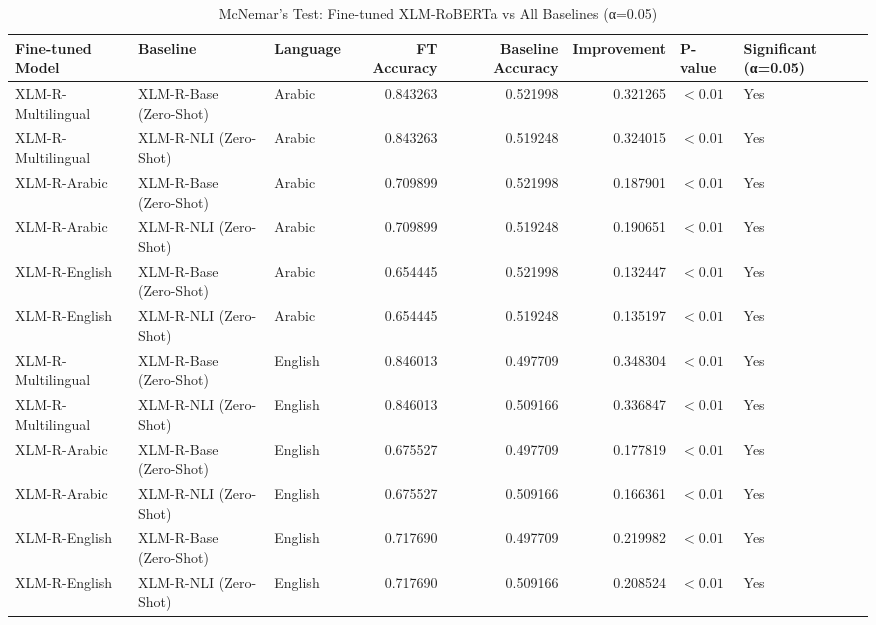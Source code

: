 \begin{table}
\caption{McNemar's Test: Fine-tuned XLM-RoBERTa vs All Baselines (α=0.05)}
\label{tab:mcnemar_all_baselines}
\begin{tabular}{lllrrrll}
\toprule
Fine-tuned Model & Baseline & Language & FT Accuracy & Baseline Accuracy & Improvement & P-value & Significant (α=0.05) \\
\midrule
XLM-R-Multilingual & XLM-R-Base (Zero-Shot) & Arabic & 0.843263 & 0.521998 & 0.321265 & $<0.01$ & Yes \\
XLM-R-Multilingual & XLM-R-NLI (Zero-Shot) & Arabic & 0.843263 & 0.519248 & 0.324015 & $<0.01$ & Yes \\
XLM-R-Arabic & XLM-R-Base (Zero-Shot) & Arabic & 0.709899 & 0.521998 & 0.187901 & $<0.01$ & Yes \\
XLM-R-Arabic & XLM-R-NLI (Zero-Shot) & Arabic & 0.709899 & 0.519248 & 0.190651 & $<0.01$ & Yes \\
XLM-R-English & XLM-R-Base (Zero-Shot) & Arabic & 0.654445 & 0.521998 & 0.132447 & $<0.01$ & Yes \\
XLM-R-English & XLM-R-NLI (Zero-Shot) & Arabic & 0.654445 & 0.519248 & 0.135197 & $<0.01$ & Yes \\
XLM-R-Multilingual & XLM-R-Base (Zero-Shot) & English & 0.846013 & 0.497709 & 0.348304 & $<0.01$ & Yes \\
XLM-R-Multilingual & XLM-R-NLI (Zero-Shot) & English & 0.846013 & 0.509166 & 0.336847 & $<0.01$ & Yes \\
XLM-R-Arabic & XLM-R-Base (Zero-Shot) & English & 0.675527 & 0.497709 & 0.177819 & $<0.01$ & Yes \\
XLM-R-Arabic & XLM-R-NLI (Zero-Shot) & English & 0.675527 & 0.509166 & 0.166361 & $<0.01$ & Yes \\
XLM-R-English & XLM-R-Base (Zero-Shot) & English & 0.717690 & 0.497709 & 0.219982 & $<0.01$ & Yes \\
XLM-R-English & XLM-R-NLI (Zero-Shot) & English & 0.717690 & 0.509166 & 0.208524 & $<0.01$ & Yes \\
\bottomrule
\end{tabular}
\end{table}
